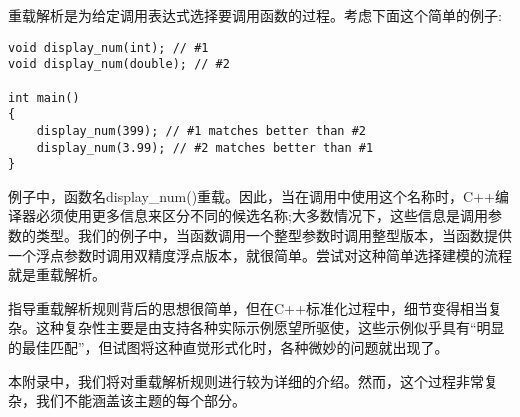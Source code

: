 重载解析是为给定调用表达式选择要调用函数的过程。考虑下面这个简单的例子:

\begin{lstlisting}[style=styleCXX]
void display_num(int); // #1
void display_num(double); // #2

int main()
{
	display_num(399); // #1 matches better than #2
	display_num(3.99); // #2 matches better than #1
}
\end{lstlisting}

例子中，函数名display\_num()重载。因此，当在调用中使用这个名称时，C++编译器必须使用更多信息来区分不同的候选名称;大多数情况下，这些信息是调用参数的类型。我们的例子中，当函数调用一个整型参数时调用整型版本，当函数提供一个浮点参数时调用双精度浮点版本，就很简单。尝试对这种简单选择建模的流程就是重载解析。

指导重载解析规则背后的思想很简单，但在C++标准化过程中，细节变得相当复杂。这种复杂性主要是由支持各种实际示例愿望所驱使，这些示例似乎具有“明显的最佳匹配”，但试图将这种直觉形式化时，各种微妙的问题就出现了。

本附录中，我们将对重载解析规则进行较为详细的介绍。然而，这个过程非常复杂，我们不能涵盖该主题的每个部分。
























